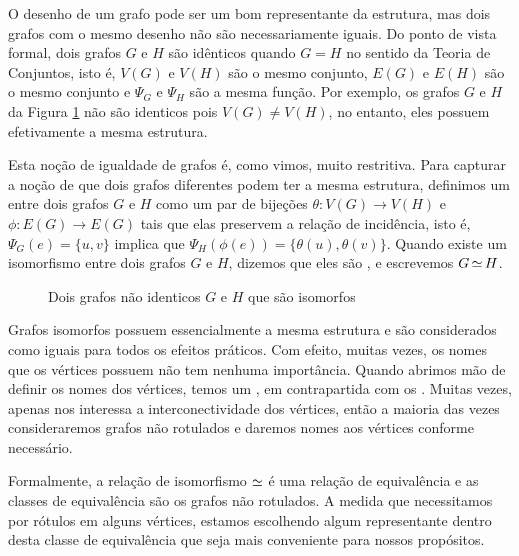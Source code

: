 O desenho de um grafo pode ser um bom representante da estrutura, mas dois grafos com o mesmo desenho não são necessariamente iguais. Do ponto de vista formal, dois grafos $G$ e $H$ são idênticos quando $G = H$ no sentido da Teoria de Conjuntos, isto é, $V(G)$ e $V(H)$ são o mesmo conjunto, $E(G)$ e $E(H)$ são o mesmo conjunto e $\Psi_G$ e $\Psi_H$ são a mesma função. Por exemplo, os grafos $G$ e $H$ da Figura \ref{fig:iso} não são identicos pois $V(G) \neq V(H)$, no entanto, eles possuem efetivamente a mesma estrutura.

Esta noção de igualdade de grafos é, como vimos, muito restritiva. Para capturar a noção de que dois grafos diferentes podem ter a mesma estrutura, definimos um  entre dois grafos $G$ e $H$ como um par de bijeções $\theta : V(G) \to V(H)$ e $\phi : E(G) \to E(G)$ tais que elas preservem a relação de incidência, isto é, $\Psi_G(e) = \{u,v\}$ implica que $\Psi_H(\phi(e)) = \{\theta(u),\theta(v)\}$. Quando existe um isomorfismo entre dois grafos $G$ e $H$, dizemos que eles são , e escrevemos $G \operatorname{\simeq} H$.

\begin{figure}[h!]
\centering
{}
\caption{Dois grafos não identicos $G$ e $H$ que são isomorfos}
\label{fig:iso}
\end{figure}

Grafos isomorfos possuem essencialmente a mesma estrutura e são considerados como iguais para todos os efeitos práticos. Com efeito, muitas vezes, os nomes que os vértices possuem não tem nenhuma importância. Quando abrimos mão de definir os nomes dos vértices, temos um , em contrapartida com os . Muitas vezes, apenas nos interessa a interconectividade dos vértices, então a maioria das vezes consideraremos grafos não rotulados e daremos nomes aos vértices conforme necessário.

Formalmente, a relação de isomorfismo $\operatorname{\simeq}$ é uma relação de equivalência e as classes de equivalência são os grafos não rotulados. A medida que necessitamos por rótulos em alguns vértices, estamos escolhendo algum representante dentro desta classe de equivalência que seja mais conveniente para nossos propósitos.

